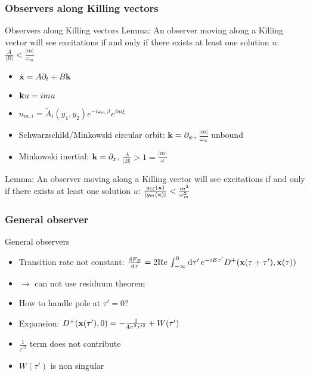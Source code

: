 \documentclass{beamer}
\let\todox\todo
\renewcommand\todo[1]{\todox[inline]{#1}}
\begin{document}
\subsubsection{Observers along Killing vectors}
\begin{frame}{Observers along Killing vectors}
Lemma: \todo{box} An observer moving along a Killing vector will see excitations if and only if there exists at least one solution \(u\): \(\frac{A}{|B|} < \frac{|m|}{\omega_m}\)
\begin{itemize}
	\item \(\dot{\vb{x}} = A\partial_t + B\vb{k}\)
	\item \(\vb{k} u = i m u\)
\end{itemize}
\begin{itemize}
	\item \(u_{m, i} = \tilde{A}_i(y_1, y_2) e^{-i\omega_{m,i} t} e^{i m \xi}\)
	\item Schwarzschild/Minkowski circular orbit: \(\vb{k} = \partial_\phi\), \(\frac{|m|}{\omega_m}\) unbound
	\item Minkowski inertial: \(\vb{k} = \partial_x\), \(\frac{A}{|B|} > 1 = \frac{|m|}{\omega}\) 
\end{itemize}
Lemma: \todo{box} An observer moving along a Killing vector will see excitations if and only if there exists at least one solution \(u\): \(\frac{g_{\xi\xi}(\vb{x})}{|g_{tt}(\vb{x})|} < \frac{m^2}{\omega_m^2}\)
\end{frame}

\subsubsection{General observer}
\begin{frame}{General observers}
\begin{itemize}
	\item Transition rate not constant: \(\dv{F_E}{\tau} = 2 \mathrm{Re}\,\int_{-\infty}^0 \dd{\tau'} e^{-i E \tau'} D^+(\vb{x}(\tau + \tau'), \vb{x}(\tau))\)
	\item[]\(\to\) can not use residuum theorem
	\item How to handle pole at \(\tau' = 0\)?
	\item Expansion: \(D^+(\vb{x}(\tau'), 0) = - \frac{1}{4\pi^2\tau'^2} + W(\tau')\)
	\item \(\frac{1}{\tau'^2}\) term does not contribute
	\item \(W(\tau')\) is non singular
\end{itemize}
\end{frame}
\end{document}
